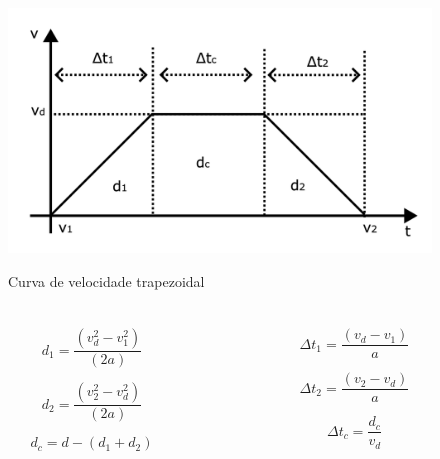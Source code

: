 \documentclass[aspectratio=169]{beamer}
\begin{document}
\begin{frame}
  \frametitle{\insertsubsection}
  \begin{figure}[H]
    \centering
    \caption{Curva de velocidade trapezoidal}
    \includegraphics[width=.8\textwidth]{trap_curv}
    \label{fig:trap_curv}
  \end{figure}
\end{frame}

\begin{frame}
  \frametitle{\insertsubsection}
  \begin{columns}
    \begin{column}{.45\textwidth}
      
      \begin{equation}
        \label{eq:des_seg_1_trap}
        d_1 = \frac{(v_d^2-v_1^2)}{(2 a)}
      \end{equation}

      \begin{equation}
        \label{eq:des_seg_2_trap}
        d_2 = \frac{(v_2^2-v_d^2)}{(2 a)}
      \end{equation}

      \begin{equation}
        \label{eq:des_seg_c_trap}
        d_c = d-(d_1+d_2)
      \end{equation}
    \end{column}
    \begin{column}{.45\textwidth}
      
      \begin{equation}
        \label{eq:dt_seg_1_trap}
        \Delta t_1 = \frac{(v_d-v_1)}{a}
      \end{equation}

      \begin{equation}
        \label{eq:dt_seg_2_trap}
        \Delta t_2 = \frac{(v_2-v_d)}{a}
      \end{equation}

      \begin{equation}
        \label{eq:dt_seg_c_trap}
        \Delta t_c = \frac{d_c}{v_d}
      \end{equation}
    \end{column}
  \end{columns}
\end{frame}
\end{document}
